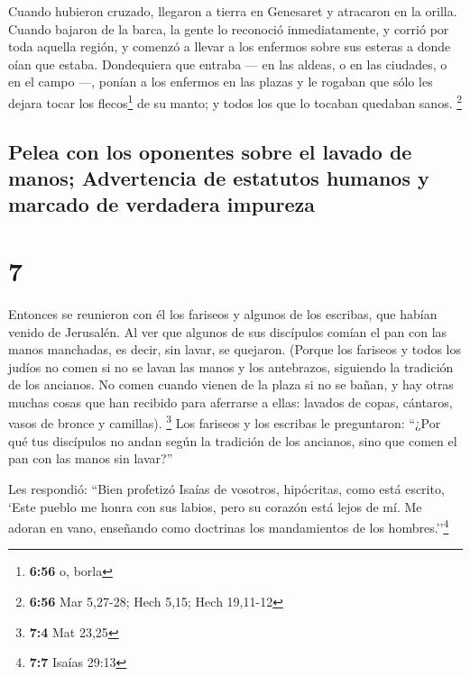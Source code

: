  Cuando hubieron cruzado, llegaron a tierra en Genesaret
y atracaron en la orilla.  Cuando bajaron de la barca, la
gente lo reconoció inmediatamente,  y corrió por toda
aquella región, y comenzó a llevar a los enfermos sobre sus esteras a
donde oían que estaba.  Dondequiera que entraba --- en
las aldeas, o en las ciudades, o en el campo ---, ponían a los enfermos
en las plazas y le rogaban que sólo les dejara tocar los
flecos\footnote{\textbf{6:56} o, borla} de su manto; y todos los que lo
tocaban quedaban sanos. \footnote{\textbf{6:56} Mar 5,27-28; Hech 5,15;
  Hech 19,11-12}

\hypertarget{pelea-con-los-oponentes-sobre-el-lavado-de-manos-advertencia-de-estatutos-humanos-y-marcado-de-verdadera-impureza}{%
\subsection{Pelea con los oponentes sobre el lavado de manos;
Advertencia de estatutos humanos y marcado de verdadera
impureza}\label{pelea-con-los-oponentes-sobre-el-lavado-de-manos-advertencia-de-estatutos-humanos-y-marcado-de-verdadera-impureza}}

\hypertarget{section-6}{%
\section{7}\label{section-6}}

 Entonces se reunieron con él los fariseos y algunos de
los escribas, que habían venido de Jerusalén.  Al ver que
algunos de sus discípulos comían el pan con las manos manchadas, es
decir, sin lavar, se quejaron.  (Porque los fariseos y
todos los judíos no comen si no se lavan las manos y los antebrazos,
siguiendo la tradición de los ancianos.  No comen cuando
vienen de la plaza si no se bañan, y hay otras muchas cosas que han
recibido para aferrarse a ellas: lavados de copas, cántaros, vasos de
bronce y camillas). \footnote{\textbf{7:4} Mat 23,25}  Los
fariseos y los escribas le preguntaron: ``¿Por qué tus discípulos no
andan según la tradición de los ancianos, sino que comen el pan con las
manos sin lavar?''

 Les respondió: ``Bien profetizó Isaías de vosotros,
hipócritas, como está escrito, `Este pueblo me honra con sus labios,
pero su corazón está lejos de mí.  Me adoran en vano,
enseñando como doctrinas los mandamientos de los hombres.''\footnote{\textbf{7:7}
  Isaías 29:13}

